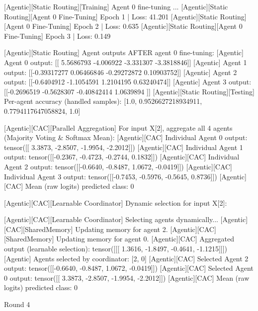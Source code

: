 [Agentic][Static Routing][Training] Agent 0 fine-tuning ...
[Agentic][Static Routing][Agent 0 Fine-Tuning] Epoch 1 | Loss: 41.201
[Agentic][Static Routing][Agent 0 Fine-Tuning] Epoch 2 | Loss: 0.635
[Agentic][Static Routing][Agent 0 Fine-Tuning] Epoch 3 | Loss: 0.149

[Agentic][Static Routing] Agent outputs AFTER agent 0 fine-tuning:
[Agentic] Agent 0 output: [[ 5.5686793 -4.006922  -3.331307  -3.3818846]]
[Agentic] Agent 1 output: [[-0.39317277  0.06466846 -0.29272872  0.10903752]]
[Agentic] Agent 2 output: [[-0.6404912  -1.1054591   1.2104195   0.63240474]]
[Agentic] Agent 3 output: [[-0.2696519  -0.5628307  -0.40842414  1.0639894 ]]
[Agentic][Static Routing][Testing] Per-agent accuracy (handled samples): [1.0, 0.9526627218934911, 0.7794117647058824, 1.0]

[Agentic][CAC][Parallel Aggregation] For input X[2], aggregate all 4 agents (Majority Voting & Softmax Mean):
[Agentic][CAC] Individual Agent 0 output: tensor([[ 3.3873, -2.8507, -1.9954, -2.2012]])
[Agentic][CAC] Individual Agent 1 output: tensor([[-0.2367, -0.4723, -0.2744,  0.1832]])
[Agentic][CAC] Individual Agent 2 output: tensor([[-0.6640, -0.8487,  1.0672, -0.0419]])
[Agentic][CAC] Individual Agent 3 output: tensor([[-0.7453, -0.5976, -0.5645,  0.8736]])
[Agentic][CAC] Mean (raw logits) predicted class: 0

[Agentic][CAC][Learnable Coordinator] Dynamic selection for input X[2]:

[Agentic][CAC][Learnable Coordinator] Selecting agents dynamically...
[Agentic][CAC][SharedMemory] Updating memory for agent 2.
[Agentic][CAC][SharedMemory] Updating memory for agent 0.
[Agentic][CAC] Aggregated output (learnable selection): tensor([[[ 1.3616, -1.8497, -0.4641, -1.1215]]])
[Agentic] Agents selected by coordinator: [2, 0]
[Agentic][CAC] Selected Agent 2 output: tensor([[-0.6640, -0.8487,  1.0672, -0.0419]])
[Agentic][CAC] Selected Agent 0 output: tensor([[ 3.3873, -2.8507, -1.9954, -2.2012]])
[Agentic][CAC] Mean (raw logits) predicted class: 0

Round 4

